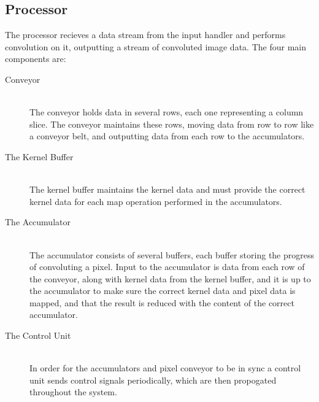 \subsection{Processor}

The processor recieves a data stream from the input handler and performs convolution on it, outputting a stream of convoluted image data.
The four main components are:
\begin{description}
    \item[Conveyor] \hfill\\ 
        The conveyor holds data in several rows, each one representing a column slice. The conveyor maintains these rows, moving data from row to row like a conveyor belt, and outputting data from each row to the accumulators.
    \item[The Kernel Buffer] \hfill\\
        The kernel buffer maintains the kernel data and must provide the correct kernel data for each map operation performed in the accumulators.
    \item[The Accumulator] \hfill\\
        The accumulator consists of several buffers, each buffer storing the progress of convoluting a pixel.
        Input to the accumulator is data from each row of the conveyor, along with kernel data from the kernel buffer, and it is up to the accumulator to make sure the correct kernel data and pixel data is mapped, and that the result is reduced with the content of the correct accumulator.
    \item[The Control Unit] \hfill\\
        In order for the accumulators and pixel conveyor to be in sync a control unit sends control signals periodically, which are then propogated throughout the system.
\end{description}



